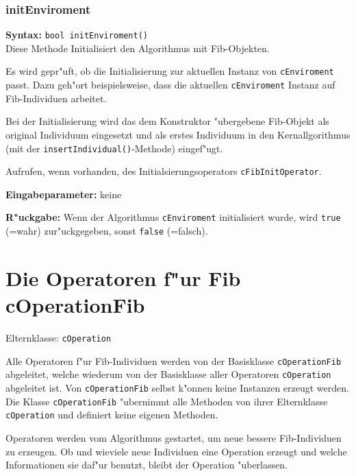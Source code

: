\subsubsection{initEnviroment}

\textbf{Syntax:} \verb|bool initEnviroment()| \\

Diese Methode Initialisiert den Algorithmus mit Fib-Objekten.

Es wird gepr"uft, ob die Initialisierung zur aktuellen Instanz von \verb|cEnviroment| passt. Dazu geh"ort beispielsweise, dass die aktuellen \verb|cEnviroment| Instanz auf Fib-Individuen arbeitet.

Bei der Initialisierung wird das dem Konstruktor "ubergebene Fib-Objekt als original Individuum eingesetzt und als erstes Individuum in den Kernallgorithmus (mit der \verb|insertIndividual()|-Methode) eingef"ugt.

Aufrufen, wenn vorhanden, des Initialsierungsoperators \verb|cFibInitOperator|.

\bigskip\noindent
\textbf{Eingabeparameter:} keine

\bigskip\noindent
\textbf{R"uckgabe:} Wenn der Algorithmus \verb|cEnviroment| initialisiert wurde, wird \verb|true| (=wahr) zur"uckgegeben, sonst \verb|false| (=falsch).



\section{Die Operatoren f"ur Fib cOperationFib}
\label{secFibOperations}

Elternklasse: \verb|cOperation|

\bigskip\noindent
Alle Operatoren  f"ur Fib-Individuen werden von der Basisklasse \verb|cOperationFib| abgeleitet, welche wiederum von der Basisklasse aller Operatoren \verb|cOperation| abgeleitet ist. Von \verb|cOperationFib| selbst k"onnen keine Instanzen erzeugt werden. Die Klasse \verb|cOperationFib| "ubernimmt alle Methoden von ihrer Elternklasse \verb|cOperation| und definiert keine eigenen Methoden.

Operatoren werden vom Algorithmus gestartet, um neue bessere Fib-Individuen zu erzeugen. Ob und wieviele neue Individuen eine Operation erzeugt und welche Informationen sie daf"ur benutzt, bleibt der Operation "uberlassen.






